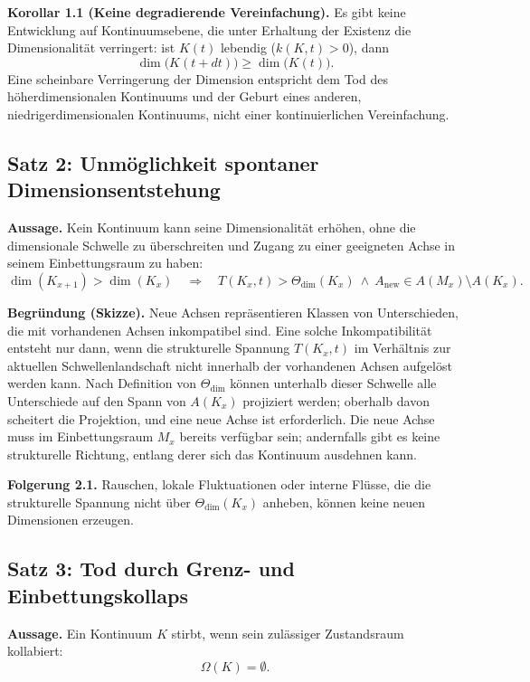 \textbf{Korollar 1.1 (Keine degradierende Vereinfachung).}
Es gibt keine Entwicklung auf Kontinuumsebene, die unter Erhaltung der Existenz die Dimensionalität verringert:
ist \(K(t)\) lebendig (\(k(K,t) > 0\)), dann
\[
    \dim\big(K(t+dt)\big) \ge \dim\big(K(t)\big).
\]
Eine scheinbare Verringerung der Dimension entspricht dem Tod des höherdimensionalen Kontinuums und der Geburt eines anderen, niedrigerdimensionalen Kontinuums, nicht einer kontinuierlichen Vereinfachung.

\subsection{Satz 2: Unmöglichkeit spontaner Dimensionsentstehung}

\textbf{Aussage.}
Kein Kontinuum kann seine Dimensionalität erhöhen, ohne die dimensionale Schwelle zu überschreiten und Zugang zu einer geeigneten Achse in seinem Einbettungsraum zu haben:
\[
    \dim(K_{x+1}) > \dim(K_x)
    \quad\Rightarrow\quad
    T(K_x,t) > \Theta_{\mathrm{dim}}(K_x)
    \ \wedge\
    A_{\mathrm{new}} \in A(M_x)\setminus A(K_x).
\]

\textbf{Begründung (Skizze).}
Neue Achsen repräsentieren Klassen von Unterschieden, die mit vorhandenen Achsen inkompatibel sind.
Eine solche Inkompatibilität entsteht nur dann, wenn die strukturelle Spannung \(T(K_x,t)\) im Verhältnis zur aktuellen Schwellenlandschaft nicht innerhalb der vorhandenen Achsen aufgelöst werden kann.
Nach Definition von \(\Theta_{\mathrm{dim}}\) können unterhalb dieser Schwelle alle Unterschiede auf den Spann von \(A(K_x)\) projiziert werden; oberhalb davon scheitert die Projektion, und eine neue Achse ist erforderlich.
Die neue Achse muss im Einbettungsraum \(M_x\) bereits verfügbar sein; andernfalls gibt es keine strukturelle Richtung, entlang derer sich das Kontinuum ausdehnen kann.

\textbf{Folgerung 2.1.}
Rauschen, lokale Fluktuationen oder interne Flüsse, die die strukturelle Spannung nicht über \(\Theta_{\mathrm{dim}}(K_x)\) anheben, können keine neuen Dimensionen erzeugen.

\subsection{Satz 3: Tod durch Grenz- und Einbettungskollaps}

\textbf{Aussage.}
Ein Kontinuum \(K\) stirbt, wenn sein zulässiger Zustandsraum kollabiert:
\[
    \Omega(K) = \emptyset.
\]

